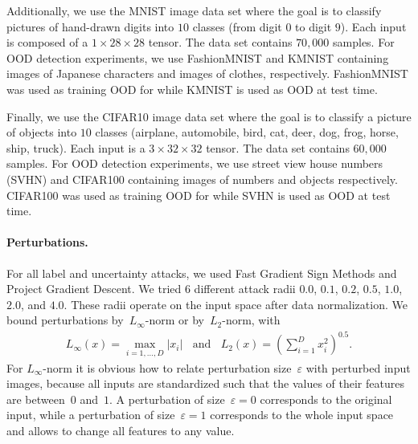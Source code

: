 Additionally, we use the MNIST image data set \cite{mnist} where the goal is to classify pictures of hand-drawn digits into $10$ classes (from digit $0$ to digit $9$). Each input is composed of a $1 \times 28 \times 28$ tensor. The data set contains $70,000$ samples. For OOD detection experiments, we use FashionMNIST \cite{fashionmnist} and KMNIST \cite{kmnist} containing images of Japanese characters and images of clothes, respectively. FashionMNIST was used as training OOD for \PriorNet while KMNIST is used as OOD at test time.

Finally, we use the CIFAR10 image data set \cite{cifar10} where the goal is to classify a picture of objects into $10$ classes (airplane, automobile, bird, cat, deer, dog, frog, horse, ship, truck). Each input is a $3 \times 32 \times 32$ tensor. The data set contains $60,000$ samples. For OOD detection experiments, we use street view house numbers (SVHN) \cite{svhn}  and CIFAR100 \citep{cifar10} containing images of numbers and objects respectively. CIFAR100 was used as training OOD for \PriorNet while SVHN is used as OOD at test time.
 
\paragraph{Perturbations.} For all label and uncertainty attacks, we used Fast Gradient Sign Methods and Project Gradient Descent. We tried 6 different attack radii $0.0$, $0.1$, $0.2$, $0.5$, $1.0$, $2.0$, and $4.0$. These radii operate on the input space after data normalization. We bound perturbations by~$L_{\infty}$-norm or by~$L_2$-norm, with 
%
\begin{equation}
\begin{aligned}
	L_{\infty} (x) = \max_{i=1,\dots, D} \left|x_i\right| \mathrm{~~~~and~~~~}
	L_2 (x)        = (\sum_{i=1}^{D} x_i^2)^{0.5}.
\end{aligned}
\end{equation}
%
For $L_{\infty}$-norm it is obvious how to relate perturbation size~$\varepsilon$ with perturbed input images, because all inputs are standardized such that the values of their features are between~$0$ and~$1$.
A perturbation of size~$\varepsilon=0$ corresponds to the original input, while a perturbation of size~$\varepsilon=1$ corresponds to the whole input space and allows to change all features to any value. 


